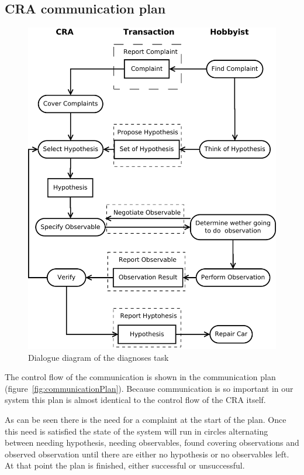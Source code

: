 \documentclass[a4paper,10pt]{article}
\begin{document}
\subsection{CRA communication plan}
\begin{figure}[htbp]
	\centering
		\includegraphics[width=1.00\textwidth]{dialogueDiagram.pdf}
	\caption{Dialogue diagram of the diagnoses task}
	\label{fig:dialogueDiagram}
\end{figure}

The control flow of the communication is shown in the communication plan (figure~\ref{fig:communicationPlan}). Because communication is so important in our system this plan is almost identical to the control flow of the CRA itself. 

As can be seen there is the need for a complaint at the start of the plan. Once this need is satisfied the state of the system will run in circles alternating between needing hypothesis, needing observables, found covering observations and observed observation until there are either no hypothesis or no observables left. At that point the plan is finished, either successful or unsuccessful.
\end{document}
